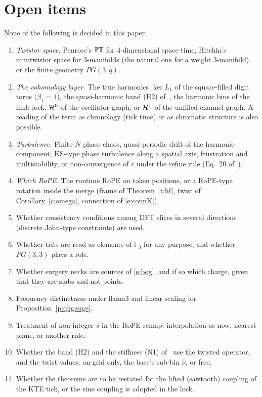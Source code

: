 \documentclass[10pt]{article}
\theoremstyle{definition}
\begin{document}
\section{Open items}\label{s:open}
None of the following is decided in this paper.
\begin{enumerate}\itemsep1pt
\item[O1] \emph{Twistor space.} Penrose's $\mathbb{PT}$ for 4-dimensional space-time, Hitchin's minitwistor space for 3-manifolds (the natural one for a weight 3-manifold), or the finite geometry $PG(3,q)$.
\item[O2] \emph{The cohomology layer.} The true harmonics $\ker L_1$ of the square-filled digit torus ($\beta_1=4$), the quasi-harmonic band (H2) of~\cite{dtft}, the harmonic bins of the limb lock, $\mathcal H^0$ of the oscillator graph, or $\mathcal H^1$ of the unfilled channel graph. A reading of the term as chronology (tick time) or as chromatic structure is also possible.
\item[O3] \emph{Turbulence.} Finite-$N$ phase chaos, quasi-periodic drift of the harmonic component, KS-type phase turbulence along a spatial axis, frustration and multistability, or non-convergence of $r$ under the refine rule (Eq.~20 of~\cite{pv2}).
\item[O4] \emph{Which RoPE.} The runtime RoPE on token positions, or a RoPE-type rotation inside the merge (frame of Theorem~\ref{t:hf}, twist of Corollary~\ref{c:omega}, connection of \eqref{e:connK}).
\item[O5] Whether consistency conditions among DFT slices in several directions (discrete John-type constraints) are used.
\item[O6] Whether trits are read as elements of $\mathbb F_3$ for any purpose, and whether $PG(3,3)$ plays a role.
\item[O7] Whether surgery necks are sources of \eqref{e:bog}, and if so which charge, given that they are slabs and not points.
\item[O8] Frequency distinctness under llama3 and linear scaling for Proposition~\ref{p:qkgauge}.
\item[O9] Treatment of non-integer $s$ in the RoPE remap: interpolation as now, nearest plane, or another rule.
\item[O10] Whether the band (H2) and the stiffness (N1) of~\cite{dtft} use the twisted operator, and the twist values: on-grid only, the base's sub-bin $\hat\nu$, or free.
\item[O11] Whether the theorems are to be restated for the lifted (sawtooth) coupling of the KTE tick, or the sine coupling is adopted in the lock.

\end{enumerate}
\end{document}
